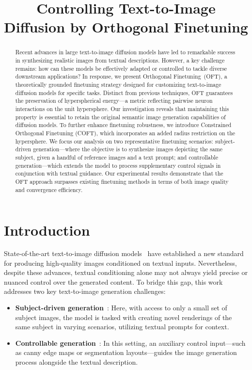 \title{Controlling Text-to-Image Diffusion by Orthogonal Finetuning}

\begin{abstract}
Recent advances in large text-to-image diffusion models have led to remarkable success in synthesizing realistic images from textual descriptions. However, a key challenge remains: how can these models be effectively adapted or controlled to tackle diverse downstream applications? In response, we present Orthogonal Finetuning~(OFT), a theoretically grounded finetuning strategy designed for customizing text-to-image diffusion models for specific tasks. Distinct from previous techniques, OFT guarantees the preservation of hyperspherical energy—a metric reflecting pairwise neuron interactions on the unit hypersphere. Our investigation reveals that maintaining this property is essential to retain the original semantic image generation capabilities of diffusion models. To further enhance finetuning robustness, we introduce Constrained Orthogonal Finetuning (COFT), which incorporates an added radius restriction on the hypersphere. We focus our analysis on two representative finetuning scenarios: subject-driven generation—where the objective is to synthesize images depicting the same subject, given a handful of reference images and a text prompt; and controllable generation—which extends the model to process supplementary control signals in conjunction with textual guidance. Our experimental results demonstrate that the OFT approach surpasses existing finetuning methods in terms of both image quality and convergence efficiency.
\end{abstract}

\section{Introduction}

State-of-the-art text-to-image diffusion models~\cite{saharia2022photorealistic,ramesh2022hierarchical,rombach2022high} have established a new standard for producing high-quality images conditioned on textual inputs. Nevertheless, despite these advances, textual conditioning alone may not always yield precise or nuanced control over the generated content. To bridge this gap, this work addresses two key text-to-image generation challenges:

\begin{itemize}[leftmargin=*,nosep]

    \item \textbf{Subject-driven generation}~\cite{ruiz2023dreambooth}: Here, with access to only a small set of subject images, the model is tasked with creating novel renderings of the same subject in varying scenarios, utilizing textual prompts for context.
    \item \textbf{Controllable generation}~\cite{zhang2023adding,mou2023t2i}: In this setting, an auxiliary control input—such as canny edge maps or segmentation layouts—guides the image generation process alongside the textual description.
\end{itemize}

